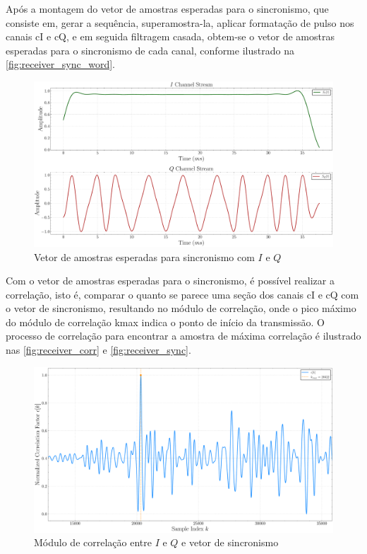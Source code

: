 Após a montagem do vetor de amostras esperadas para o sincronismo, que consiste em, gerar a sequência, superamostra-la, aplicar formatação de pulso nos canais \gls{cI} e \gls{cQ}, e em seguida filtragem casada, obtem-se o vetor de amostras esperadas para o sincronismo de cada canal, conforme ilustrado na \autoref{fig:receiver_sync_word}.

\begin{figure}[H]
	\centering
	\caption{Vetor de amostras esperadas para sincronismo com $I$ e $Q$}\label{fig:receiver_sync_word}
	\includegraphics[width=\linewidth]{assets/cap3/example_synchronizer_word.pdf}
\end{figure}

Com o vetor de amostras esperadas para o sincronismo, é possível realizar a correlação, isto é, comparar o quanto se parece uma seção dos canais \gls{cI} e \gls{cQ} com o vetor de sincronismo, resultando no módulo de correlação, onde o pico máximo do módulo de correlação \gls{kmax} indica o ponto de início da transmissão. O processo de correlação para encontrar a amostra de máxima correlação é ilustrado nas \autoref{fig:receiver_corr} e \autoref{fig:receiver_sync}.

\begin{figure}[H]
	\centering
	\caption{Módulo de correlação entre $I$ e $Q$ e vetor de sincronismo}\label{fig:receiver_corr}
	\includegraphics[width=\linewidth]{assets/cap3/receiver_sync_corr.pdf}
\end{figure}

